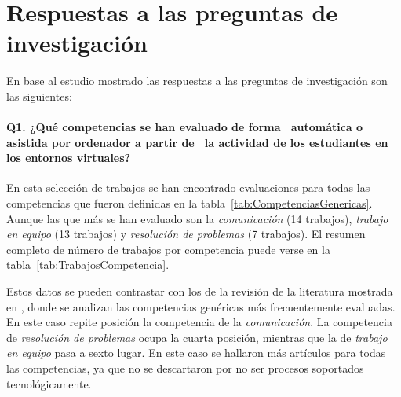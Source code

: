 \pagestyle{fancy}
\section{Respuestas a las preguntas de investigación}

En base al estudio mostrado las respuestas a las preguntas de investigación son las siguientes:

\paragraph*{Q1. ¿Qué competencias se han evaluado de forma \, automática o asistida por ordenador  a partir de  \, la actividad de los estudiantes en los entornos virtuales?}


En esta selección de trabajos se han encontrado evaluaciones para todas las competencias que fueron definidas en la tabla~\ref{tab:CompetenciasGenericas}. Aunque las que más se han evaluado son la \emph{comunicación} (14 trabajos), \emph{trabajo en equipo} (13 trabajos) y \emph{resolución de problemas} (7 trabajos). El resumen completo de número de trabajos por competencia puede verse en la tabla~\ref{tab:TrabajosCompetencia}.

Estos datos se pueden contrastar con los de la revisión de la literatura mostrada en \cite{strijbos2015criteria}, donde se analizan las competencias genéricas más frecuentemente evaluadas. En este caso repite posición la competencia de la \emph{comunicación}. La competencia de \emph{resolución de problemas} ocupa la cuarta posición, mientras que la de \emph{trabajo en equipo} pasa a sexto lugar. En este caso se hallaron más artículos para todas las competencias, ya que no se descartaron por no ser procesos soportados tecnológicamente. 


